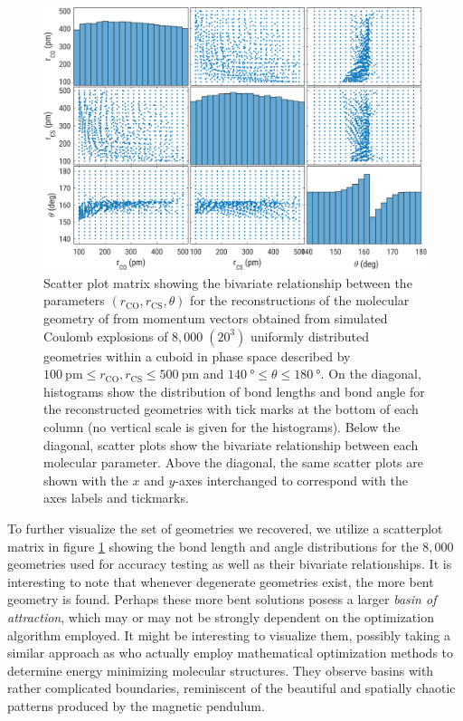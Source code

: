 \begin{figure}
  \centering
  \includegraphics[width=\textwidth]{Plots/OCS222DegeneracyMapHDPairs}
  \caption[Scatter plot matrix showing the bivariate relationship between the parameters $(r_\mathrm{CO}, r_\mathrm{CS}, \theta)$ for the reconstructions of the molecular geometry of  from momentum vectors obtained from simulated Coulomb explosions.]
  {Scatter plot matrix showing the bivariate relationship between the parameters $(r_\mathrm{CO}, r_\mathrm{CS}, \theta)$ for the reconstructions of the molecular geometry of  from momentum vectors obtained from simulated Coulomb explosions of $8,000 \; (20^3)$ uniformly distributed geometries within a cuboid in phase space described by $\SI{100}{\pico\meter} \le r_\mathrm{CO}, r_\mathrm{CS} \le \SI{500}{\pico\meter}$ and $\SI{140}{\degree} \le \theta \le \SI{180}{\degree}$. On the diagonal, histograms show the distribution of bond lengths and bond angle for the reconstructed geometries with tick marks at the bottom of each column (no vertical scale is given for the histograms). Below the diagonal, scatter plots show the bivariate relationship between each molecular parameter. Above the diagonal, the same scatter plots are shown with the $x$ and $y$-axes interchanged to correspond with the axes labels and tickmarks.}
  \label{fig:OCS222DegeneracyMapHDPairs}
\end{figure}

To further visualize the set of geometries we recovered, we utilize a scatterplot matrix in figure \ref{fig:OCS222DegeneracyMapHDPairs} showing the bond length and angle distributions for the $8,000$ geometries used for accuracy testing as well as their bivariate relationships. It is interesting to note that whenever degenerate geometries exist, the more bent geometry is found. Perhaps these more bent solutions posess a larger \emph{basin of attraction}, which may or may not be strongly dependent on the optimization algorithm employed. It might be interesting to visualize them, possibly taking a similar approach as \citet{Asenjo13} who actually employ mathematical optimization methods to determine energy minimizing molecular structures. They observe basins with rather complicated boundaries, reminiscent of the beautiful and spatially chaotic patterns produced by the magnetic pendulum.

